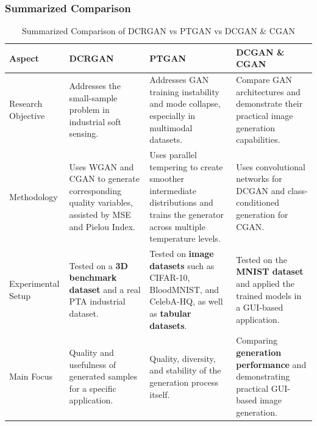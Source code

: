 \documentclass[12pt,a4paper]{article}
\begin{document}
\subsubsection{Summarized Comparison}
\begin{table}[H]
\caption{Summarized Comparison of DCRGAN vs PTGAN vs DCGAN \& CGAN}
\label{tab:inclusion-exclusion}

\fontsize{10pt}{12pt}\selectfont

\begin{tabular}{|p{3cm}|p{4cm}|p{4cm}|p{4cm}|}
\hline
\centering\textbf{Aspect} &
\centering\textbf{DCRGAN} &
\centering\textbf{PTGAN} &
\centering\textbf{DCGAN \& CGAN}
\tabularnewline
\hline

\centering Research Objective &
Addresses the small-sample problem in industrial soft sensing. &
Addresses GAN training instability and mode collapse, especially in multimodal datasets. &
Compare GAN architectures and demonstrate their practical image generation capabilities.
\tabularnewline 
\hline

\centering Methodology &
Uses WGAN and CGAN to generate corresponding quality variables, assisted by MSE and Pielou Index. &
Uses parallel tempering to create smoother intermediate distributions and trains the generator across multiple temperature levels. &
Uses convolutional networks for DCGAN and class-conditioned generation for CGAN.
\tabularnewline
\hline

\centering Experimental Setup &
Tested on a \textbf{3D benchmark dataset} and a real PTA industrial dataset. &
Tested on \textbf{image datasets} such as CIFAR-10, BloodMNIST, and CelebA-HQ, as well as \textbf{tabular datasets}. &
Tested on the \textbf{MNIST dataset} and applied the trained models in a GUI-based application.
\tabularnewline
\hline

\centering Main Focus &
Quality and usefulness of generated samples for a specific application. &
Quality, diversity, and stability of the generation process itself. &
Comparing \textbf{generation performance} and demonstrating practical GUI-based image generation.
\tabularnewline
\hline

\end{tabular}

\end{table}
\end{document}
